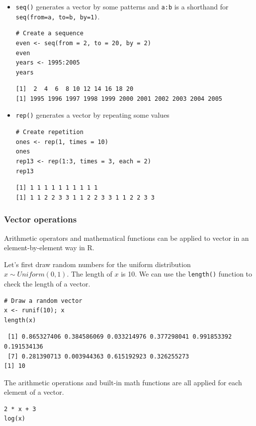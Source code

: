 \documentclass[a4paper,11pt]{article}
\begin{document}
\begin{itemize}
\item \texttt{seq()} generates a vector by some patterns and \texttt{a:b} is a shorthand
for \texttt{seq(from=a, to=b, by=1)}.

\begin{verbatim}
# Create a sequence
even <- seq(from = 2, to = 20, by = 2)
even
years <- 1995:2005
years
\end{verbatim}

\begin{verbatim}
[1]  2  4  6  8 10 12 14 16 18 20
[1] 1995 1996 1997 1998 1999 2000 2001 2002 2003 2004 2005
\end{verbatim}

\item \texttt{rep()} generates a vector by repeating some values

\begin{verbatim}
# Create repetition
ones <- rep(1, times = 10)
ones
rep13 <- rep(1:3, times = 3, each = 2)
rep13
\end{verbatim}

\begin{verbatim}
[1] 1 1 1 1 1 1 1 1 1 1
[1] 1 1 2 2 3 3 1 1 2 2 3 3 1 1 2 2 3 3
\end{verbatim}
\end{itemize}

\subsubsection*{Vector operations}
\label{sec:org4cc3ac5}

Arithmetic operators and mathematical functions can be applied to
vector in an element-by-element way in R.

Let's first draw random numbers for the uniform distribution
\(x \sim Uniform(0, 1)\). The length of \(x\) is 10. We can use the
\texttt{length()} function to check the length of a vector.

\begin{verbatim}
# Draw a random vector
x <- runif(10); x
length(x)
\end{verbatim}

\begin{verbatim}
 [1] 0.865327406 0.384586069 0.033214976 0.377298041 0.991853392 0.191534136
 [7] 0.281390713 0.003944363 0.615192923 0.326255273
[1] 10
\end{verbatim}

The arithmetic operations and built-in math functions are all applied
for each element of a vector.
\begin{verbatim}
2 * x + 3
log(x)
\end{verbatim}
\end{document}
